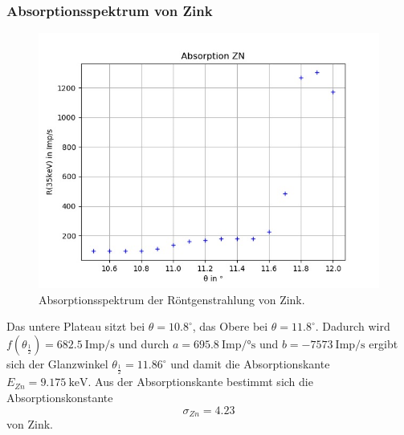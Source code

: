 \subsubsection*{Absorptionsspektrum von Zink}
\begin{figure}[H]
  \centering
  \includegraphics{content/Zn.png}
  \caption{Absorptionsspektrum der Röntgenstrahlung von Zink.}
  \label{fig:zn}
\end{figure}
Das untere Plateau sitzt bei $\theta=10.8^\circ$, das Obere bei $\theta=11.8^\circ$. Dadurch wird $f(\theta_{\frac{1}{2}})=682.5\ \textrm{Imp/s}$ und durch $a=695.8\ \textrm{Imp/°s}$ und $b=-7573\ \textrm{Imp/s}$ ergibt sich der Glanzwinkel $\theta_{\frac{1}{2}}=11.86^\circ$ und damit die Absorptionskante $E_{Zn}=9.175\ \textrm{keV}$. Aus der Absorptionskante bestimmt sich die Absorptionskonstante
\begin{equation*}
  \sigma_{Zn}=4.23
\end{equation*}
von Zink.

